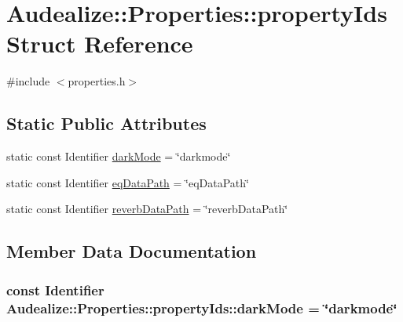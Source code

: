 \hypertarget{struct_audealize_1_1_properties_1_1property_ids}{}\section{Audealize\+:\+:Properties\+:\+:property\+Ids Struct Reference}
\label{struct_audealize_1_1_properties_1_1property_ids}


{\ttfamily \#include $<$properties.\+h$>$}

\subsection*{Static Public Attributes}
\begin{DoxyCompactItemize}
\item 
static const Identifier \hyperlink{struct_audealize_1_1_properties_1_1property_ids_ac923e49d8c252be90f90bed7292bf378}{dark\+Mode} = \char`\"{}darkmode\char`\"{}
\item 
static const Identifier \hyperlink{struct_audealize_1_1_properties_1_1property_ids_a0104341c16f19ea1043a55fe9a478c80}{eq\+Data\+Path} = \char`\"{}eq\+Data\+Path\char`\"{}
\item 
static const Identifier \hyperlink{struct_audealize_1_1_properties_1_1property_ids_a55966884d5356be5b001664c9a175f42}{reverb\+Data\+Path} = \char`\"{}reverb\+Data\+Path\char`\"{}
\end{DoxyCompactItemize}


\subsection{Member Data Documentation}
\subsubsection[{\texorpdfstring{dark\+Mode}{darkMode}}]{\setlength{\rightskip}{0pt plus 5cm}const Identifier Audealize\+::\+Properties\+::property\+Ids\+::dark\+Mode = \char`\"{}darkmode\char`\"{}\hspace{0.3cm}{\ttfamily [static]}}\hypertarget{struct_audealize_1_1_properties_1_1property_ids_ac923e49d8c252be90f90bed7292bf378}{}\label{struct_audealize_1_1_properties_1_1property_ids_ac923e49d8c252be90f90bed7292bf378}
